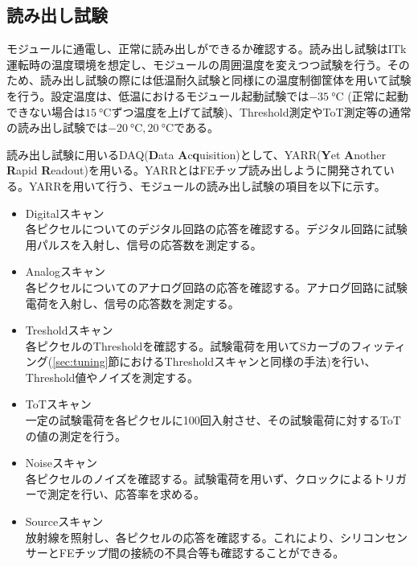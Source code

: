 \subsection{読み出し試験}
\label{sec:electricaltest}
モジュールに通電し、正常に読み出しができるか確認する。読み出し試験はITk運転時の温度環境を想定し、モジュールの周囲温度を変えつつ試験を行う。そのため、読み出し試験の際には低温耐久試験と同様にの温度制御筐体を用いて試験を行う。設定温度は、低温におけるモジュール起動試験では$-35\ \si{\degreeCelsius}$ (正常に起動できない場合は$15\ \si{\degreeCelsius}$ずつ温度を上げて試験)、Threshold測定やToT測定等の通常の読み出し試験では$-20\ \si{\degreeCelsius}, 20\ \si{\degreeCelsius}$である。

読み出し試験に用いるDAQ(\textbf{D}ata \textbf{A}c\textbf{q}uisition)として、YARR(\textbf{Y}et \textbf{A}nother \textbf{R}apid \textbf{R}eadout)を用いる。YARRとはFEチップ読み出しように開発されている。YARRを用いて行う、モジュールの読み出し試験の項目を以下に示す。

\begin{itemize}
  \item Digitalスキャン \\
  各ピクセルについてのデジタル回路の応答を確認する。デジタル回路に試験用パルスを入射し、信号の応答数を測定する。
  \item Analogスキャン \\
  各ピクセルについてのアナログ回路の応答を確認する。アナログ回路に試験電荷を入射し、信号の応答数を測定する。
  \item Tresholdスキャン \\
  各ピクセルのThresholdを確認する。試験電荷を用いてSカーブのフィッティング(\ref{sec:tuning}節におけるThresholdスキャンと同様の手法)を行い、Threshold値やノイズを測定する。
  \item ToTスキャン \\
  一定の試験電荷を各ピクセルに100回入射させ、その試験電荷に対するToTの値の測定を行う。
  \item Noiseスキャン \\
  各ピクセルのノイズを確認する。試験電荷を用いず、クロックによるトリガーで測定を行い、応答率を求める。
  \item Sourceスキャン \\
  放射線を照射し、各ピクセルの応答を確認する。これにより、シリコンセンサーとFEチップ間の接続の不具合等も確認することができる。
\end{itemize}

